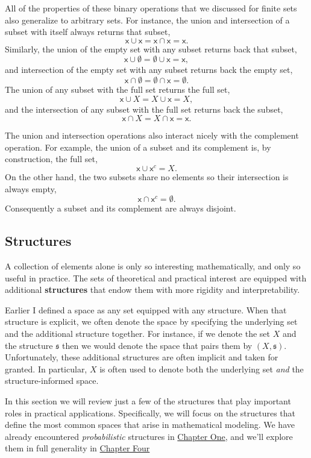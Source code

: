 \documentclass[
  letterpaper,
  DIV=11,
  numbers=noendperiod]{scrartcl}
\begin{document}
All of the properties of these binary operations that we discussed for
finite sets also generalize to arbitrary sets. For instance, the union
and intersection of a subset with itself always returns that subset, \[
\mathsf{x} \cup \mathsf{x}
=
\mathsf{x} \cap \mathsf{x}
=
\mathsf{x}.
\] Similarly, the union of the empty set with any subset returns back
that subset, \[
\mathsf{x} \cup \emptyset
=
\emptyset \cup \mathsf{x}
=
\mathsf{x},
\] and intersection of the empty set with any subset returns back the
empty set, \[
\mathsf{x} \cap \emptyset
=
\emptyset \cap \mathsf{x}
=
\emptyset.
\] The union of any subset with the full set returns the full set, \[
\mathsf{x} \cup X = X \cup \mathsf{x} = X,
\] and the intersection of any subset with the full set returns back the
subset, \[
\mathsf{x} \cap X = X \cap \mathsf{x} = \mathsf{x}.
\]

The union and intersection operations also interact nicely with the
complement operation. For example, the union of a subset and its
complement is, by construction, the full set, \[
\mathsf{x} \cup \mathsf{x}^{c} = X.
\] On the other hand, the two subsets share no elements so their
intersection is always empty, \[
\mathsf{x} \cap \mathsf{x}^{c} = \emptyset.
\] Consequently a subset and its complement are always disjoint.

\subsection{Structures}\label{sec:structures}

A collection of elements alone is only so interesting mathematically,
and only so useful in practice. The sets of theoretical and practical
interest are equipped with additional \textbf{structures} that endow
them with more rigidity and interpretability.

Earlier I defined a space as any set equipped with any structure. When
that structure is explicit, we often denote the space by specifying the
underlying set and the additional structure together. For instance, if
we denote the set \(X\) and the structure \(\mathfrak{s}\) then we would
denote the space that pairs them by \((X, \mathfrak{s})\).
Unfortunately, these additional structures are often implicit and taken
for granted. In particular, \(X\) is often used to denote both the
underlying set \emph{and} the structure-informed space.

In this section we will review just a few of the structures that play
important roles in practical applications. Specifically, we will focus
on the structures that define the most common spaces that arise in
mathematical modeling. We have already encountered \emph{probabilistic}
structures in
\href{http://www.symplectomorphic.com/assets/chapters_html/probability_on_finite_sets.html}{Chapter
One}, and we'll explore them in full generality in
\href{http://www.symplectomorphic.com/assets/chapters_html/probability_on_general_spaces.html}{Chapter
Four}
\end{document}
